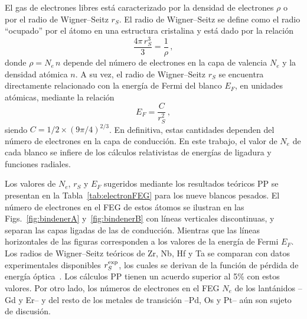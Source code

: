 El gas de electrones libres está caracterizado por la densidad de 
electrones $\rho$ o por el radio de Wigner--Seitz $r_S$. El radio de 
Wigner--Seitz se define como el radio ``ocupado'' por el átomo en una 
estructura cristalina y está dado por la relación
\begin{equation}
\frac{4\pi \,r_S^3}{3}=\frac{1}{\rho}\,,
\end{equation} 
donde $\rho=N_e \,n$ depende del número de electrones en la capa de 
valencia $N_e$ y la densidad atómica $n$. 
A su vez, el radio de Wigner--Seitz $r_S$ se encuentra directamente 
relacionado con la energía de Fermi del blanco $E_F$, en unidades 
atómicas, mediante la relación 
\begin{equation}
E_F=\frac{C}{r_S^2}\,,
\end{equation} 
siendo $C=1/2\times(9\pi/4)^{2/3}$. 
En definitiva, estas cantidades dependen del número de electrones en la 
capa de conducción. En este trabajo, el valor de $N_e$ de cada blanco se 
infiere de los cálculos relativistas de energías de ligadura y 
funciones radiales.

Los valores de $N_e$, $r_S$ y $E_F$ sugeridos mediante los resultados 
teóricos PP se presentan en la Tabla~\ref{tab:electronFEG} para los 
nueve blancos pesados. El número de electrones en el FEG de estos átomos 
se ilustran en las Figs.~\ref{fig:bindenerA} y~\ref{fig:bindenerB} con 
líneas verticales discontinuas, y separan las capas ligadas de las de 
conducción. Mientras que las líneas horizontales de las figuras 
corresponden a los valores de la energía de Fermi $E_F$. Los radios de 
Wigner--Seitz teóricos de Zr, Nb, Hf y Ta se comparan con datos 
experimentales disponibles $r_S^{\mbox{\scriptsize exp}}$, los cuales se 
derivan de la función de pérdida de energía 
óptica~\cite{Werner:09,Lynch:75,Isaacson:75,Romaniello:06}. Los cálculos 
PP tienen un acuerdo superior al 5\% con estos valores. Por otro lado, 
los números de electrones en el FEG $N_e$ de los lantánidos --Gd y Er-- 
y del resto de los metales de transición --Pd, Os y Pt-- aún son sujeto 
de discusión. 

